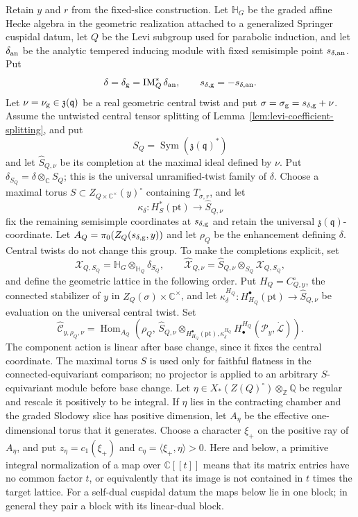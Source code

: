 \documentclass[11pt]{amsart}
\theoremstyle{definition}
\theoremstyle{remark}
\newcommand{\Hh}{\mathbb H}
\newcommand{\C}{\mathbb C}
\newcommand{\A}{\C[[t]]}
\begin{document}
Retain $y$ and $r$ from the fixed-slice construction.  Let $\Hh_G$ be the
graded affine Hecke algebra in the geometric realization attached to a generalized
Springer cuspidal datum, let $Q$ be the Levi subgroup used for parabolic
induction, and let $\delta_{\rm an}$ be the analytic tempered inducing
module with fixed semisimple point $s_{\delta,{\rm an}}$.  Put
\[
 \delta=\delta_{\rm g}=\operatorname{IM}_Q^*\delta_{\rm an},
 \qquad s_{\delta,{\rm g}}=-s_{\delta,{\rm an}}.
\]
Let $\nu=\nu_{\rm g}\in\mathfrak z(\mathfrak q)$ be a real geometric
central twist and put $\sigma=\sigma_{\rm g}=s_{\delta,{\rm g}}+\nu$.
Assume the untwisted central tensor splitting of
Lemma~\ref{lem:levi-coefficient-splitting}, and put
\[
 S_Q=\operatorname{Sym}(\mathfrak z(\mathfrak q)^*)
\]
and let $\widehat S_{Q,\nu}$ be its completion at the maximal ideal defined by
$\nu$.  Put $\delta_{S_Q}=\delta\otimes_{\mathbb C}S_Q$; this is the
universal unramified-twist family of $\delta$.  Choose a maximal torus
$S\subset Z_{Q\times\mathbb C^\times}(y)^\circ$ containing
$T_{\sigma,r}$, and let
\[
 \kappa_\delta:H_S^*(\mathrm{pt})\longrightarrow\widehat S_{Q,\nu}
\]
fix the remaining semisimple coordinates at $s_{\delta,{\rm g}}$ and retain
the universal $\mathfrak z(\mathfrak q)$-coordinate.  Let
$A_Q=\pi_0(Z_Q(s_{\delta,{\rm g}},y))$ and let $\rho_Q$ be the enhancement
defining $\delta$.  Central twists do not change this group.
To make the completions explicit, set
\[
 \mathcal X_{Q,S_Q}=\Hh_G\otimes_{\Hh_Q}\delta_{S_Q},\qquad
 \widehat{\mathcal X}_{Q,\nu}
 =\widehat S_{Q,\nu}\otimes_{S_Q}\mathcal X_{Q,S_Q},
\]
and define the geometric lattice in the following order.
Put $H_Q=C_{Q,y}^\circ$, the connected stabilizer of $y$ in
$Z_Q(\sigma)\times\mathbb C^\times$, and let
$\kappa_\delta^{H_Q}:H_{H_Q}^\bullet(\mathrm{pt})\to\widehat S_{Q,\nu}$
be evaluation on the universal central twist.  Set
\[
 \widehat{\mathcal C}_{y,\rho_Q,\nu}
 =\operatorname{Hom}_{A_Q}\!\left(
 \rho_Q,\,
 \widehat S_{Q,\nu}\otimes_{H_{H_Q}^\bullet(\mathrm{pt}),
                            \kappa_\delta^{H_Q}}
 H_\bullet^{H_Q}(\mathcal P_y,\dot{\mathcal L})\right).
\]
The component action is linear after base change, since it fixes the
central coordinate.  The maximal torus $S$ is used only for faithful
flatness in the connected-equivariant comparison; no projector is
applied to an arbitrary $S$-equivariant module before base change.
Let $\eta\in X_*(Z(Q)^\circ)\otimes_{\mathbb Z}\mathbb Q$ be regular and
rescale it positively to be integral.  If $\eta$ lies in the contracting
chamber and the graded Slodowy slice has positive dimension, let $A_\eta$ be the effective
one-dimensional torus that it generates.  Choose a character $\xi_+$ on the
positive ray of $A_\eta$, and put
$z_\eta=c_1(\xi_+)$ and
$c_\eta=\langle\xi_+,\eta\rangle>0$.
Here and below, a primitive integral normalization of a map over $\A$ means
that its matrix entries have no common factor $t$, or equivalently that its
image is not contained in $t$ times the target lattice.  For a self-dual
cuspidal datum the maps below lie in one block; in general they pair a block
with its linear-dual block.
\end{document}
